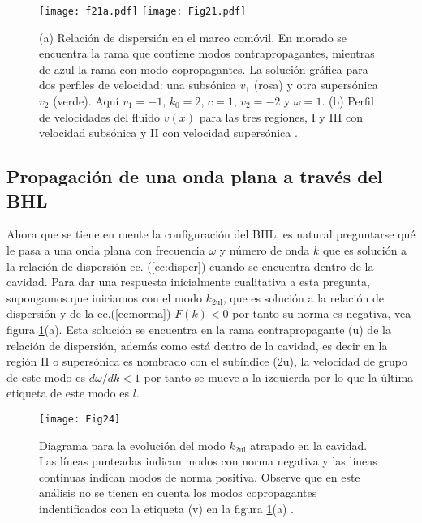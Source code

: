 \begin{figure}
 
   \centering
   \texttt{[image: f21a.pdf]}%
   \hspace{0.1cm}%
   \texttt{[image: Fig21.pdf]}%
   \caption{(a) Relaci\'{o}n de dispersi\'{o}n en el marco com\'{o}vil. En morado se encuentra la rama que contiene modos contrapropagantes, mientras de azul la rama con modo copropagantes. La solución gráfica para dos perfiles de velocidad: una subsónica $v_1$ (rosa) y otra supersónica $v_2$ (verde). Aquí $v_1= -1$, $k_0 = 2$, $c = 1$, $v_2= - 2$ y $\omega=1$. (b) Perfil de velocidades del fluido $v(x)$ para las tres regiones, I y III con velocidad subs\'{o}nica y II con velocidad supers\'{o}nica \citep{2018Bermudez}.} 
   \label{fig:2.1}
\end{figure}

\subsection{Propagaci\'{o}n de una onda plana a trav\'{e}s del BHL}

Ahora que se tiene en mente la configuraci\'{o}n del BHL,  es natural preguntarse qu\'{e} le pasa a una onda plana con frecuencia $\omega$ y n\'{u}mero de onda $k$ que es soluci\'{o}n a la relaci\'{o}n de dispersi\'{o}n  ec. (\ref{ec:disper}) cuando se encuentra dentro de la cavidad. Para dar una respuesta inicialmente cualitativa a esta pregunta, supongamos que iniciamos con el modo $k_{\text{2ul}}$, que es soluci\'{o}n a la relaci\'{o}n de dispersi\'{o}n y de la ec.(\ref{ec:norma}) $F(k)<0$ por tanto su norma es negativa, vea figura \ref{fig:2.1}(a). Esta soluci\'{o}n se encuentra en la rama contrapropagante (u) de la relaci\'{o}n de dispersi\'{o}n, adem\'{a}s como est\'{a} dentro de la cavidad, es decir en la regi\'{o}n II o supers\'{o}nica es nombrado con el sub\'{i}ndice ($2$u), la velocidad de grupo de este modo es $d\omega/dk<1$ por tanto se mueve a la izquierda por lo que la \'{u}ltima etiqueta de este modo es $l$.\\
\begin{figure}\centering
	\texttt{[image: Fig24]}
	\caption{Diagrama para la evoluci\'{o}n del modo $k_{2\text{ul}}$ atrapado en la cavidad. Las l\'{i}neas punteadas indican modos con norma negativa y las l\'{i}neas continuas indican modos de norma positiva. Observe que en este an\'{a}lisis no se tienen en cuenta los modos copropagantes indentificados con la etiqueta (v) en la figura \ref{fig:2.1}(a) \citep{2018Bermudez}.}\label{fig:2.2}
\end{figure}

